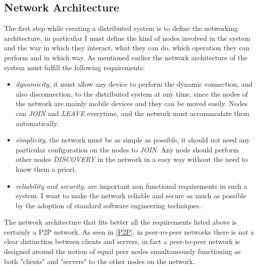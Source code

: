 \subsection{Network Architecture}
The first step while creating a distributed system is to define the networking architecture, in particular I must define the kind of nodes involved in the system and the way in which they interact, what they can do, which operation they can perform and in which way. As mentioned earlier the network architecture of the system must fulfill the following requirements:
\begin{itemize}
 \item \textit{dynamicity}, it must allow any device to perform the dynamic connection, and also disconnection, to the distributed system at any time, since the nodes of the network are mainly mobile devices and they can be moved easily. Nodes can \textit{JOIN} and \textit{LEAVE} everytime, and the network must accommodate them automatically.
  \item \textit{simplicity}, the network must be as simple as possible, it should not need any particular configuration on the nodes to \textit{JOIN}. Any node should perform other nodes \textit{DISCOVERY} in the network in a easy way without the need to know them a priori.
 \item \textit{reliability and security}, are important non functional requirements in such a system. I want to make the network reliable and secure as much as possible by the adoption of standard software engineering techniques.
\end{itemize}
The network architecture that fits better all the requirements listed above is certainly a P2P network. As seen in \ref{P2P}, in peer-ro-peer networks there is not a clear distinction between clients and servers, in fact a peer-to-peer network is designed around the notion of equal peer nodes simultaneously functioning as both "clients" and "servers" to the other nodes on the network.


